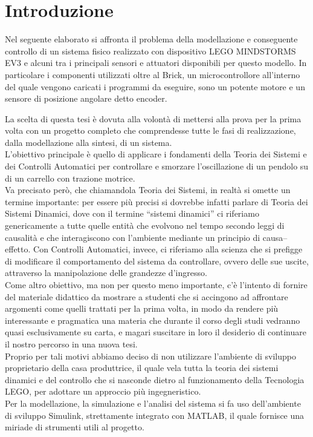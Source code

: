 \chapter{Introduzione}
Nel seguente elaborato si affronta il problema della modellazione e conseguente controllo di un sistema fisico realizzato con dispositivo LEGO MINDSTORMS EV3 e alcuni tra i principali sensori e attuatori disponibili per questo modello.
In particolare i componenti utilizzati oltre al Brick, un microcontrollore all'interno del quale vengono caricati i programmi da eseguire, sono un potente motore e un sensore di posizione angolare detto encoder.

La scelta di questa tesi è dovuta alla volontà di mettersi alla prova per la prima volta con un progetto completo che comprendesse tutte le fasi di realizzazione, dalla modellazione alla sintesi, di un sistema.\\

L'obiettivo principale è quello di applicare i fondamenti della Teoria dei Sistemi e dei Controlli Automatici per controllare e smorzare l'oscillazione di un pendolo su di un carrello con trazione motrice.\\
Va precisato però, che chiamandola Teoria dei Sistemi, in realtà si omette un termine importante: per essere più precisi si dovrebbe infatti parlare di Teoria dei Sistemi Dinamici, dove con il termine “sistemi dinamici” ci riferiamo genericamente a tutte quelle entità che evolvono nel tempo secondo leggi di causalità e che interagiscono con l’ambiente mediante un principio di causa–effetto. Con Controlli Automatici, invece, ci riferiamo alla scienza che si prefigge di modificare il comportamento del sistema da controllare, ovvero delle sue uscite, attraverso la manipolazione delle grandezze d'ingresso.\\

Come altro obiettivo, ma non per questo meno importante, c'è l'intento di fornire del materiale didattico da mostrare a studenti che si accingono ad affrontare argomenti come quelli trattati per la prima volta, in modo da rendere più interessante e pragmatica una materia che durante il corso degli studi vedranno quasi esclusivamente su carta, e magari suscitare in loro il desiderio di continuare il nostro percorso in una nuova tesi.\\ 

Proprio per tali motivi abbiamo deciso di non utilizzare l'ambiente di sviluppo proprietario della casa produttrice, il quale vela tutta la teoria dei sistemi dinamici e del controllo che si nasconde dietro al funzionamento della Tecnologia LEGO, per adottare un approccio più ingegneristico.\\
Per la modellazione, la simulazione e l'analisi del sistema si fa uso dell'ambiente di sviluppo Simulink, strettamente integrato con MATLAB, il quale fornisce una miriade di strumenti utili al progetto.


